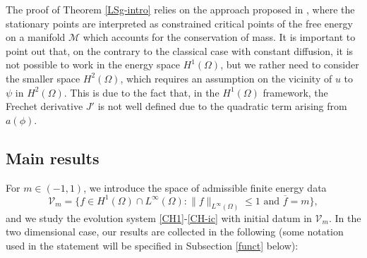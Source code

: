 \documentclass[11pt,reqno]{amsart}
\theoremstyle{remark}
\numberwithin{equation}{section}
\begin{document}
The proof of Theorem \ref{LSg-intro} relies on the approach proposed in \cite{RUPP}, where the stationary points are interpreted as constrained critical points of the free energy on a manifold $\mathcal{M}$ which accounts for the conservation of mass. It is important to point out that, on the contrary to the classical case with constant diffusion, it is not possible to work in the energy space $H^1(\Omega)$, but we rather need to consider the smaller space $H^2(\Omega)$, which requires an assumption on the vicinity of $u$ to $\psi$ in $H^2(\Omega)$.  This is due to the fact that, in the $H^1(\Omega)$ framework, the Frechet derivative $J'$ is not well defined due to the quadratic term arising from $a(\phi)$.

\medskip
\subsection{Main results}
For $m\in (-1,1)$, we introduce the space of admissible finite energy data
$$
\mathcal{V}_m = \Big\lbrace f \in H^1(\Omega)\cap L^\infty(\Omega): \| f\|_{L^\infty(\Omega)}\leq 1 \text{ and } \overline{f}=m \Big\rbrace,
$$
and we study the evolution system \eqref{CH1}-\eqref{CH-ic} with initial datum in $\mathcal{V}_m$.
In the two dimensional case, our results are collected in the following (some notation used in the statement will be specified in Subsection \ref{funct} below):
\end{document}
